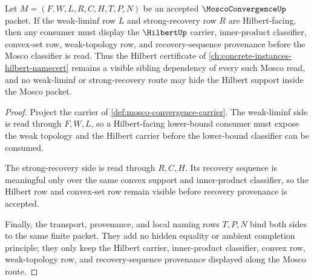 \begin{theorem}
\label{thm:mosco-convergence-hilbert-sibling-route}
Let $M=(F,W,L,R,C,H,T,P,N)$ be an accepted $\MoscoConvergenceUp$ packet. If the weak-liminf row $L$ and strong-recovery row $R$ are Hilbert-facing, then any consumer must display the $\HilbertUp$ carrier, inner-product classifier, convex-set row, weak-topology row, and recovery-sequence provenance before the Mosco classifier is read. Thus the Hilbert certificate of \autoref{ch:concrete-instances-hilbert-namecert} remains a visible sibling dependency of every such Mosco read, and no weak-liminf or strong-recovery route may hide the Hilbert support inside the Mosco packet.
\end{theorem}
\begin{proof}
Project the carrier of \autoref{def:mosco-convergence-carrier}. The weak-liminf side is read through $F,W,L$, so a Hilbert-facing lower-bound consumer must expose the weak topology and the Hilbert carrier before the lower-bound classifier can be consumed.

The strong-recovery side is read through $R,C,H$. Its recovery sequence is meaningful only over the same convex support and inner-product classifier, so the Hilbert row and convex-set row remain visible before recovery provenance is accepted.

Finally, the transport, provenance, and local naming rows $T,P,N$ bind both sides to the same finite packet. They add no hidden equality or ambient completion principle; they only keep the Hilbert carrier, inner-product classifier, convex row, weak-topology row, and recovery-sequence provenance displayed along the Mosco route.
\end{proof}

